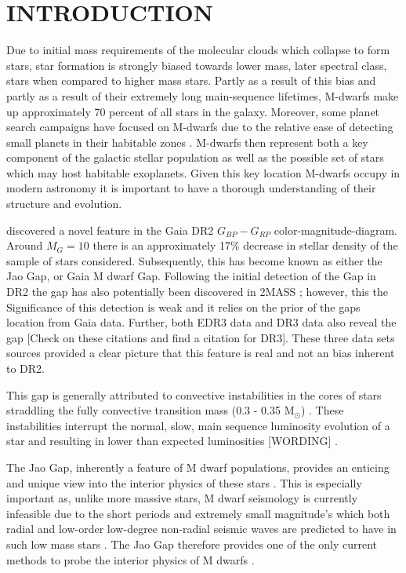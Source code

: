 \section{INTRODUCTION}\label{sec:intro}
Due to initial mass requirements of the molecular clouds which collapse to form
stars, star formation is strongly biased towards lower mass, later spectral
class, stars when compared to higher mass stars. Partly as a result of this
bias and partly as a result of their extremely long main-sequence lifetimes,
M-dwarfs make up approximately 70 percent of all stars in the galaxy. Moreover,
some planet search campaigns have focused on M-dwarfs due to the relative ease
of detecting small planets in their habitable zones \citep[e.g.][]{Nut08}.
M-dwarfs then represent both a key component of the galactic stellar population
as well as the possible set of stars which may host habitable exoplanets.
Given this key location M-dwarfs occupy in modern astronomy it is important to
have a thorough understanding of their structure and evolution.

\citet{Jao2018} discovered a novel feature in the Gaia DR2 $G_{BP}-G_{RP}$
color-magnitude-diagram. Around $M_{G}=10$ there is an approximately 17\%
decrease in stellar density of the sample of stars \citeauthor{Jao2018}
considered. Subsequently, this has become known as either the Jao Gap, or Gaia
M dwarf Gap. Following the initial detection of the Gap in DR2 the gap has also
potentially been discovered in 2MASS \citep{Jao2018}; however, this the
Significance of this detection is weak and it relies on the prior of the gaps
location from Gaia data. Further, both EDR3 data and DR3 data also reveal the
gap \citep{Jao2020} {\color{red} [Check on these citations and find a citation
for DR3]}. These three data sets sources provided a clear picture that this
feature is real and not an bias inherent to DR2.

This gap is generally attributed to convective instabilities in
the cores of stars straddling the fully convective transition mass (0.3 - 0.35
M$_{\odot}$) \citep{Baraffe2018}. These instabilities interrupt the normal,
slow, main sequence luminosity evolution of a star and resulting in lower than
expected luminosities {\color{red} [WORDING]} \citep{Jao2020}.

The Jao Gap, inherently a feature of M dwarf populations, provides an enticing
and unique view into the interior physics of these stars \citep{Feiden2021}.
This is especially important as, unlike more massive stars, M dwarf seismology
is currently infeasible due to the short periods and extremely small
magnitude's which both radial and low-order low-degree non-radial seismic waves
are predicted to have in such low mass stars \citep{Rodriguez-Lopez2019}. The
Jao Gap therefore provides one of the only current methods to probe the
interior physics of M dwarfs \citep[e.g][{\color{red}[ARE THESE THE BEST PAPERS
TO CITE HERE?]}]{Feiden2021, Mansfield2021}.

